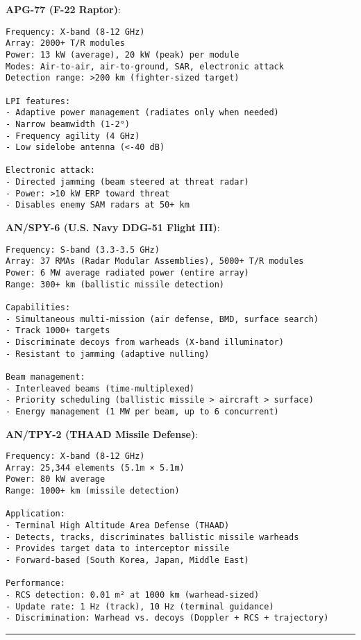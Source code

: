 \textbf{APG-77 (F-22 Raptor)}:

\begin{verbatim}
Frequency: X-band (8-12 GHz)
Array: 2000+ T/R modules
Power: 13 kW (average), 20 kW (peak) per module
Modes: Air-to-air, air-to-ground, SAR, electronic attack
Detection range: >200 km (fighter-sized target)

LPI features:
- Adaptive power management (radiates only when needed)
- Narrow beamwidth (1-2°)
- Frequency agility (4 GHz)
- Low sidelobe antenna (<-40 dB)

Electronic attack:
- Directed jamming (beam steered at threat radar)
- Power: >10 kW ERP toward threat
- Disables enemy SAM radars at 50+ km
\end{verbatim}

\textbf{AN/SPY-6 (U.S. Navy DDG-51 Flight III)}:

\begin{verbatim}
Frequency: S-band (3.3-3.5 GHz)
Array: 37 RMAs (Radar Modular Assemblies), 5000+ T/R modules
Power: 6 MW average radiated power (entire array)
Range: 300+ km (ballistic missile detection)

Capabilities:
- Simultaneous multi-mission (air defense, BMD, surface search)
- Track 1000+ targets
- Discriminate decoys from warheads (X-band illuminator)
- Resistant to jamming (adaptive nulling)

Beam management:
- Interleaved beams (time-multiplexed)
- Priority scheduling (ballistic missile > aircraft > surface)
- Energy management (1 MW per beam, up to 6 concurrent)
\end{verbatim}

\textbf{AN/TPY-2 (THAAD Missile Defense)}:

\begin{verbatim}
Frequency: X-band (8-12 GHz)
Array: 25,344 elements (5.1m × 5.1m)
Power: 80 kW average
Range: 1000+ km (missile detection)

Application:
- Terminal High Altitude Area Defense (THAAD)
- Detects, tracks, discriminates ballistic missile warheads
- Provides target data to interceptor missile
- Forward-based (South Korea, Japan, Middle East)

Performance:
- RCS detection: 0.01 m² at 1000 km (warhead-sized)
- Update rate: 1 Hz (track), 10 Hz (terminal guidance)
- Discrimination: Warhead vs. decoys (Doppler + RCS + trajectory)
\end{verbatim}

\begin{center}\rule{0.5\linewidth}{0.5pt}\end{center}

